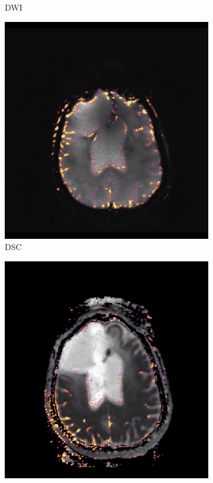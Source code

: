 \begin{figure}
\begin{subfigure}[t]{\figexamplewidth}
        \caption{\gls{DWI}}\label{fig:DWICam}
    \end{subfigure}
    \begin{subfigure}[t]{\figexamplewidth}
        \centering
        \includegraphics[width=\textwidth]{Figures/DSC_saliency}
        \caption{\gls{DSC}}\label{fig:PWICam}
    \end{subfigure}
    \begin{subfigure}[t]{\figexamplewidth}
        \centering
        \includegraphics[width=\textwidth]{Figures/DERIVED_saliency}

\end{subfigure}
\end{figure}
